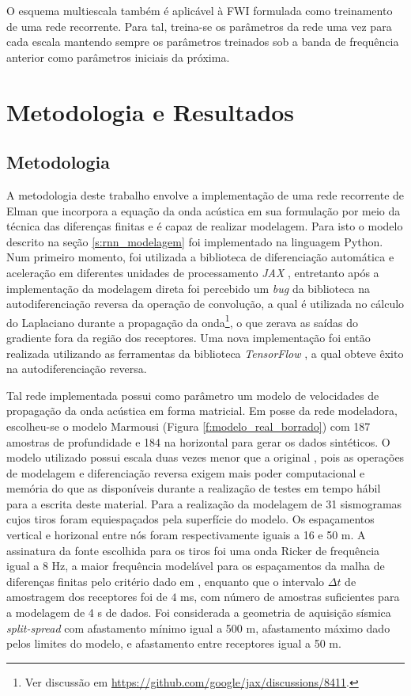     O esquema multiescala também é aplicável à FWI formulada como treinamento de uma rede recorrente. Para tal, treina-se os parâmetros da rede uma vez para cada escala mantendo sempre os parâmetros treinados sob a banda de frequência anterior como parâmetros iniciais da próxima.

\chapter{Metodologia e Resultados}

  \section{Metodologia}

    A metodologia deste trabalho envolve a implementação de uma rede recorrente de Elman que incorpora a equação da onda acústica em sua formulação por meio da técnica das diferenças finitas e é capaz de realizar modelagem. Para isto o modelo descrito na seção \ref{s:rnn_modelagem} foi implementado na linguagem Python. Num primeiro momento, foi utilizada a biblioteca de diferenciação automática e aceleração em diferentes unidades de processamento \emph{JAX} , entretanto após a implementação da modelagem direta foi percebido um \textit{bug} da biblioteca na autodiferenciação reversa da operação de convolução, a qual é utilizada no cálculo do Laplaciano durante a propagação da onda\footnote{Ver discussão em \url{https://github.com/google/jax/discussions/8411}.}, o que zerava as saídas do gradiente fora da região dos receptores. Uma nova implementação foi então realizada utilizando as ferramentas da biblioteca \emph{TensorFlow} , a qual obteve êxito na autodiferenciação reversa.

    Tal rede implementada possui como parâmetro um modelo de velocidades de propagação da onda acústica em forma matricial. Em posse da rede modeladora, escolheu-se o modelo Marmousi (Figura \ref{f:modelo_real_borrado}) com 187 amostras de profundidade e 184 na horizontal para gerar os dados sintéticos. O modelo utilizado possui escala duas vezes menor que a original , pois as operações de modelagem e diferenciação reversa exigem mais poder computacional e memória do que as disponíveis durante a realização de testes em tempo hábil para a escrita deste material. Para a realização da modelagem de 31 sismogramas cujos tiros foram equiespaçados pela superfície do modelo. Os espaçamentos vertical e horizonal entre nós foram respectivamente iguais a 16 e 50 m. A assinatura da fonte escolhida para os tiros foi uma onda Ricker de frequência igual a 8 Hz, a maior frequência modelável para os espaçamentos da malha de diferenças finitas pelo critério dado em , enquanto que o intervalo $\Delta t$ de amostragem dos receptores foi de $4$ ms, com número de amostras suficientes para a modelagem de 4 s de dados. Foi considerada a geometria de aquisição sísmica \textit{split-spread} com afastamento mínimo igual a 500 m, afastamento máximo dado pelos limites do modelo, e afastamento entre receptores igual a 50 m.

